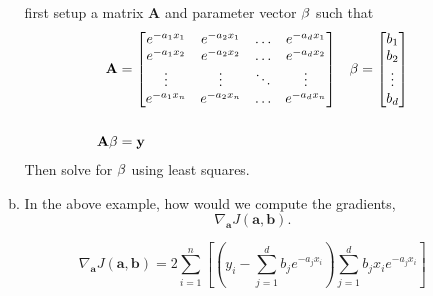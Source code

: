 \documentclass[11pt]{article}
\newcommand{\abf}{\mathbf{a}}
\newcommand{\bbf}{\mathbf{b}}
\newcommand{\ybf}{\mathbf{y}}
\newcommand{\Abf}{\mathbf{A}}
\begin{document}
\begin{enumerate}
\begin{enumerate}[(a)]
first setup a matrix $\Abf$ and parameter vector $\bf{\beta}$ such that
\begin{align*}
	\Abf & = \begin{bmatrix}
				e^{-a_1 x_1} & e^{-a_2 x_1} & \hdots & e^{-a_d x_1} \\
                e^{-a_1 x_2} & e^{-a_2 x_2} & \hdots & e^{-a_d x_2} \\
                \vdots   	 &    \vdots   	& \ddots &   \vdots 	\\
                e^{-a_1 x_n} & e^{-a_2 x_n} & \hdots & e^{-a_d x_n} \\
		   \end{bmatrix}
    & \bf{\beta} = \begin{bmatrix}
    				b_1 \\ b_2 \\ \vdots \\ b_d
				 \end{bmatrix} \\ 
                 \\
                 \Abf \bf{\beta} &= \ybf 		\\
\end{align*}
Then solve for $\bf{\beta}$ using least squares.

\item In the above example, how would we compute the gradients,
\[
    \nabla_\abf J(\abf,\bbf).
\]

\[
	\nabla_\abf J(\abf,\bbf) = 2 \sum_{i=1}^n \left[ \left( y_i - \sum_{j=1}^d b_j e^{-a_j x_i} \right) \sum_{j=1}^d b_j x_i e^{-a_j x_i} \right]
\]

\end{enumerate}

\end{enumerate}
\end{document}
